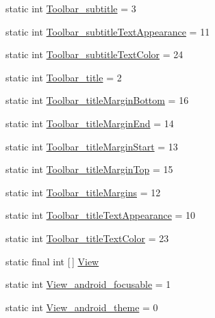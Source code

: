 \begin{DoxyCompactItemize}
\item 
static int \hyperlink{classandroid_1_1support_1_1v4_1_1R_1_1styleable_a56f57151a46ae8da5d66cce8444fc7f4}{Toolbar\+\_\+subtitle} = 3
\item 
static int \hyperlink{classandroid_1_1support_1_1v4_1_1R_1_1styleable_a6575166e631245fde7c74544cb270d07}{Toolbar\+\_\+subtitle\+Text\+Appearance} = 11
\item 
static int \hyperlink{classandroid_1_1support_1_1v4_1_1R_1_1styleable_ab4fc0b1af097899c23a2cafac5d295c6}{Toolbar\+\_\+subtitle\+Text\+Color} = 24
\item 
static int \hyperlink{classandroid_1_1support_1_1v4_1_1R_1_1styleable_a028dd183d392a34cc1188283e78f799d}{Toolbar\+\_\+title} = 2
\item 
static int \hyperlink{classandroid_1_1support_1_1v4_1_1R_1_1styleable_af61d7365bb54301d95ac8b1dbb70d637}{Toolbar\+\_\+title\+Margin\+Bottom} = 16
\item 
static int \hyperlink{classandroid_1_1support_1_1v4_1_1R_1_1styleable_a372ca0431ab4693a3248600ed75e4c10}{Toolbar\+\_\+title\+Margin\+End} = 14
\item 
static int \hyperlink{classandroid_1_1support_1_1v4_1_1R_1_1styleable_a879f1e4b1e7a561bfd7bcbcd1d237762}{Toolbar\+\_\+title\+Margin\+Start} = 13
\item 
static int \hyperlink{classandroid_1_1support_1_1v4_1_1R_1_1styleable_a4d1ca9c426378fcd3df61341e7cd11f1}{Toolbar\+\_\+title\+Margin\+Top} = 15
\item 
static int \hyperlink{classandroid_1_1support_1_1v4_1_1R_1_1styleable_acb7d5ee2c69e4de526bd73e36e16b455}{Toolbar\+\_\+title\+Margins} = 12
\item 
static int \hyperlink{classandroid_1_1support_1_1v4_1_1R_1_1styleable_a87e1a78ebc943729c097ee28bda542cd}{Toolbar\+\_\+title\+Text\+Appearance} = 10
\item 
static int \hyperlink{classandroid_1_1support_1_1v4_1_1R_1_1styleable_a249158d0b5533c28e927718a4311d4fb}{Toolbar\+\_\+title\+Text\+Color} = 23
\item 
static final int \mbox{[}$\,$\mbox{]} \hyperlink{classandroid_1_1support_1_1v4_1_1R_1_1styleable_a165672be2496e8f1adf1b075bb5fe74f}{View}
\item 
static int \hyperlink{classandroid_1_1support_1_1v4_1_1R_1_1styleable_aa77cd692bc8e686088574a84d3162278}{View\+\_\+android\+\_\+focusable} = 1
\item 
static int \hyperlink{classandroid_1_1support_1_1v4_1_1R_1_1styleable_a96cb79802865a92d4109690435c275e2}{View\+\_\+android\+\_\+theme} = 0

\end{DoxyCompactItemize}
